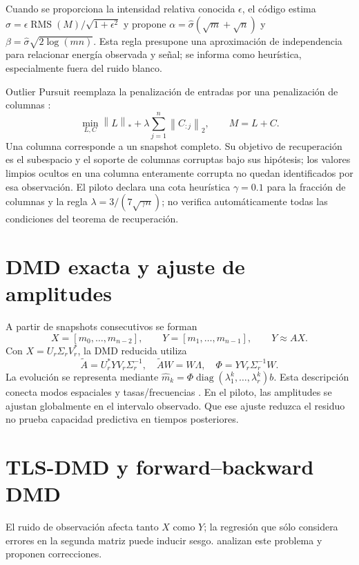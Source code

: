 \documentclass[11pt,oneside,openany]{book}
\newcommand{\norm}[1]{\left\lVert #1\right\rVert}
\DeclareMathOperator{\RMS}{RMS}
\DeclareMathOperator{\diag}{diag}
\begin{document}
Cuando se proporciona la intensidad relativa conocida $\epsilon$, el código
estima $\widehat\sigma=\epsilon\RMS(M)/\sqrt{1+\epsilon^2}$ y propone
$\alpha=\widehat\sigma(\sqrt m+\sqrt n)$ y
$\beta=\widehat\sigma\sqrt{2\log(mn)}$. Esta regla presupone una aproximación
de independencia para relacionar energía observada y señal; se informa como
heurística, especialmente fuera del ruido blanco.

Outlier Pursuit reemplaza la penalización de entradas por una penalización
de columnas \citep{xu2010outlier}:
\begin{equation}
 \min_{L,C}\norm{L}_*+\lambda\sum_{j=1}^n\norm{C_{:j}}_2,
 \qquad M=L+C.
\end{equation}
Una columna corresponde a un snapshot completo. Su objetivo de
recuperación es el subespacio y el soporte de columnas corruptas bajo sus
hipótesis; los valores limpios ocultos en una columna enteramente corrupta
no quedan identificados por esa observación. El piloto declara una cota
heurística $\gamma=0.1$ para la fracción de columnas y la regla
$\lambda=3/(7\sqrt{\gamma n})$; no verifica automáticamente todas las
condiciones del teorema de recuperación.

\section{DMD exacta y ajuste de amplitudes}
A partir de snapshots consecutivos se forman
\begin{equation}
 X=[m_0,\ldots,m_{n-2}],\qquad
 Y=[m_1,\ldots,m_{n-1}],\qquad Y\approx AX.
\end{equation}
Con $X=U_r\Sigma_rV_r^*$, la DMD reducida utiliza
\begin{equation}
 \widetilde A=U_r^*YV_r\Sigma_r^{-1},\quad
 \widetilde AW=W\Lambda,\quad
 \Phi=YV_r\Sigma_r^{-1}W.
\end{equation}
La evolución se representa mediante
$\widehat m_k=\Phi\diag(\lambda_1^k,\ldots,\lambda_r^k)b$.
Esta descripción conecta modos espaciales y tasas/frecuencias
\citep{schmid2010dmd}. En el piloto, las amplitudes se ajustan globalmente
en el intervalo observado. Que ese ajuste reduzca el residuo no prueba
capacidad predictiva en tiempos posteriores.

\section{TLS-DMD y forward--backward DMD}
El ruido de observación afecta tanto $X$ como $Y$; la regresión que sólo
considera errores en la segunda matriz puede inducir sesgo.
\citet{dawson2016noise} analizan este problema y proponen correcciones.
\end{document}
